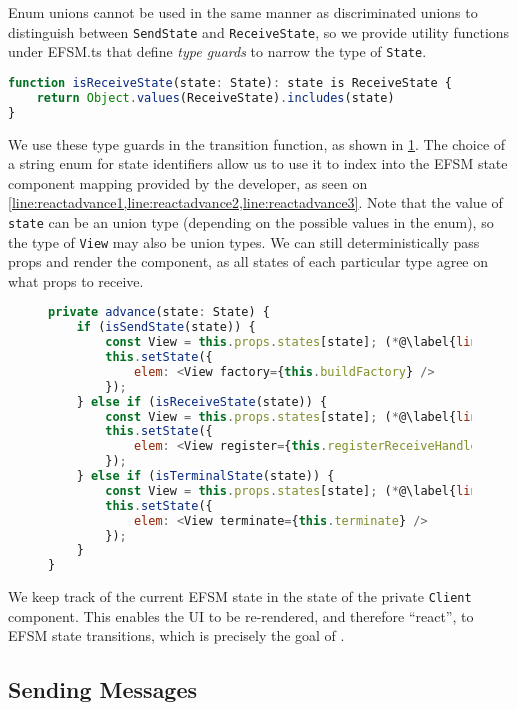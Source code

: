 Enum unions cannot be used in the same manner as discriminated unions
to distinguish between \texttt{SendState} and \texttt{ReceiveState},
so we provide utility functions under EFSM.ts that define
\textit{type guards} to narrow the type of \texttt{State}.

\begin{lstlisting}[language=javascript,numbers=none]
function isReceiveState(state: State): state is ReceiveState {
	return Object.values(ReceiveState).includes(state)
}
\end{lstlisting}

We use these type guards in the transition function,
as shown in \cref{lst:reacttransitionfunc}.
The choice of a string enum for state identifiers
allow us to use it to index into the EFSM state component mapping
provided by the developer, as seen on 
\cref{line:reactadvance1,line:reactadvance2,line:reactadvance3}.
Note that the value of \texttt{state} can be an union type
(depending on the possible values in the enum),
so the type of \texttt{View} may also be union types.
We can still deterministically pass props and render the component,
as all states of each particular type agree on what props to receive.

\begin{figure}[!h]
\begin{lstlisting}[language=javascript]
private advance(state: State) {
	if (isSendState(state)) {
		const View = this.props.states[state]; (*@\label{line:reactadvance1}@*)
		this.setState({	
			elem: <View factory={this.buildFactory} />
		});
	} else if (isReceiveState(state)) {
		const View = this.props.states[state]; (*@\label{line:reactadvance2}@*)
		this.setState({
			elem: <View register={this.registerReceiveHandler} />
		});
	} else if (isTerminalState(state)) {
		const View = this.props.states[state]; (*@\label{line:reactadvance3}@*)
		this.setState({
			elem: <View terminate={this.terminate} />
		});
	}
}
\end{lstlisting}
\label{lst:reacttransitionfunc}
\end{figure}

We keep track of the current EFSM state in the state of the
private \texttt{Client} component.
This enables the UI to be re-rendered, and therefore ``react'',
to EFSM state transitions, which is precisely the goal of 
\reactcodegen.

\subsection{Sending Messages}
\label{subsection:reactruntimesend}

